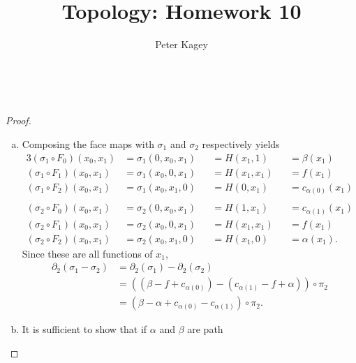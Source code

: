 \documentclass{article}
\newenvironment{problem}[2][Problem]{\begin{trivlist}
\item[\hskip \labelsep {\bfseries #1}\hskip \labelsep {\bfseries #2.}]}{\end{trivlist}}
\begin{document}
\title{Topology: Homework 10}
\author{Peter Kagey}

\maketitle

\begin{problem}{1} \text{} \\
\end{problem}

\begin{proof} ~
  \begin{enumerate}[(a)]
    \item Composing the face maps with $\sigma_1$ and $\sigma_2$ respectively
    yields \begin{alignat*}{3}
      (\sigma_1 \circ F_0)(x_0, x_1)
        &= \sigma_1(0, x_0, x_1)
        &&= H(x_1, 1)
        &&= \beta(x_1) \\
      (\sigma_1 \circ F_1)(x_0, x_1)
        &= \sigma_1(x_0, 0, x_1)
        &&= H(x_1, x_1)
        &&= f(x_1)\\
      (\sigma_1 \circ F_2)(x_0, x_1)
        &= \sigma_1(x_0, x_1, 0)
        &&= H(0, x_1)
        &&= c_{\alpha(0)}(x_1) \\
      \\
      (\sigma_2 \circ F_0)(x_0, x_1)
        &= \sigma_2(0, x_0, x_1)
        &&= H(1, x_1)
        &&= c_{\alpha(1)}(x_1) \\
      (\sigma_2 \circ F_1)(x_0, x_1)
        &= \sigma_2(x_0, 0, x_1)
        &&= H(x_1, x_1)
        &&= f(x_1)\\
      (\sigma_2 \circ F_2)(x_0, x_1)
        &= \sigma_2(x_0, x_1, 0)
        &&= H(x_1, 0)
        &&= \alpha(x_1).
    \end{alignat*}
    Since these are all functions of $x_1$, \begin{align*}
      \partial_2(\sigma_1 - \sigma_2)
      &= \partial_2(\sigma_1) - \partial_2(\sigma_2) \\
      &= ((\beta - f + c_{\alpha(0)})
      - (c_{\alpha(1)} - f + \alpha)) \circ \pi_2 \\
      &= (\beta - \alpha + c_{\alpha(0)} - c_{\alpha(1)}) \circ \pi_2.
    \end{align*}
    \item It is sufficient to show that if $\alpha$ and $\beta$ are path

\end{enumerate}
\end{proof}
\end{document}
